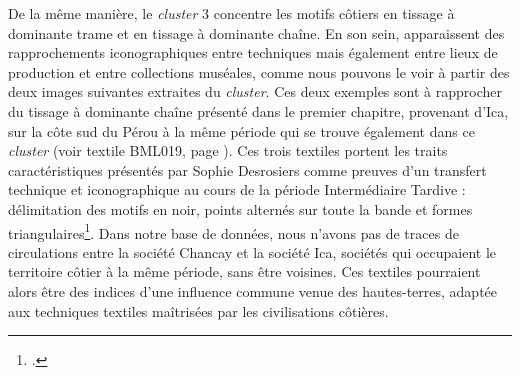 De la même manière, le \textit{cluster} 3 concentre les motifs côtiers en tissage à dominante trame et en tissage à dominante chaîne. En son sein, apparaissent des rapprochements iconographiques entre techniques mais également entre lieux de production et entre collections muséales, comme nous pouvons le voir à partir des deux images suivantes extraites du \textit{cluster}. Ces deux exemples sont à rapprocher du tissage à dominante chaîne présenté dans le premier chapitre, provenant d'Ica, sur la côte sud du Pérou à la même période qui se trouve également dans ce \textit{cluster} (voir textile BML019, page \pageref{fig:BML019}). Ces trois textiles portent les traits caractéristiques présentés par Sophie Desrosiers comme preuves d'un transfert technique et iconographique au cours de la période Intermédiaire Tardive : délimitation des motifs en noir, points alternés sur toute la bande et formes triangulaires\footcite[p.~5]{desrosiersRevisitingOcucajeOpened2008}. Dans notre base de données, nous n'avons pas de traces de circulations entre la société Chancay et la société Ica, sociétés qui occupaient le territoire côtier à la même période, sans être voisines. Ces textiles pourraient alors être des indices d'une influence commune venue des hautes-terres, adaptée aux techniques textiles maîtrisées par les civilisations côtières.

